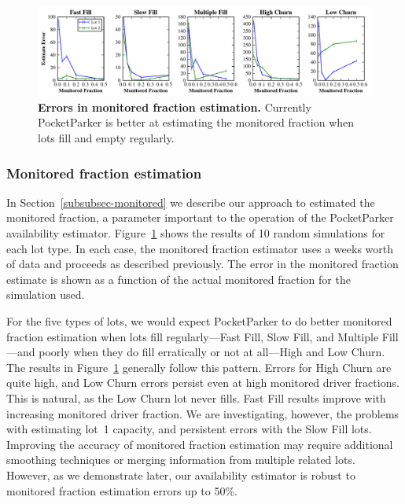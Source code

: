 \begin{figure}
\centering
\includegraphics[width=\textwidth]{./simulator/figures/capacity_experiment.pdf}

\caption{\textbf{Errors in monitored fraction estimation.} Currently
PocketParker is better at estimating the monitored fraction when lots fill
and empty regularly.}

\label{fig-capacityerrors}
\end{figure}

\subsubsection{Monitored fraction estimation}

In Section~\ref{subsubsec-monitored} we describe our approach to estimated
the monitored fraction, a parameter important to the operation of the
PocketParker availability estimator. Figure~\ref{fig-capacityerrors} shows
the results of 10 random simulations for each lot type. In each case, the
monitored fraction estimator uses a weeks worth of data and proceeds as
described previously. The error in the monitored fraction estimate is shown
as a function of the actual monitored fraction for the simulation used.

For the five types of lots, we would expect PocketParker to do better
monitored fraction estimation when lots fill regularly---Fast Fill, Slow
Fill, and Multiple Fill---and poorly when they do fill erratically or not at
all---High and Low Churn. The results in Figure~\ref{fig-capacityerrors}
generally follow this pattern. Errors for High Churn are quite high, and Low
Churn errors persist even at high monitored driver fractions. This is
natural, as the Low Churn lot never fills. Fast Fill results improve with
increasing monitored driver fraction. We are investigating, however, the
problems with estimating lot~1 capacity, and persistent errors with the Slow
Fill lots. Improving the accuracy of monitored fraction estimation may
require additional smoothing techniques or merging information from multiple
related lots. However, as we demonstrate later, our availability estimator is
robust to monitored fraction estimation errors up to 50\%.

